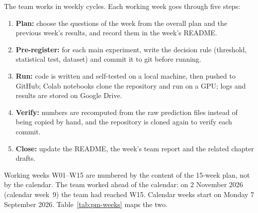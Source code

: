 The team works in weekly cycles. Each working week goes through five steps:

\begin{enumerate}
  \item \textbf{Plan:} choose the questions of the week from the overall plan and
  the previous week's results, and record them in the week's README.
  \item \textbf{Pre-register:} for each main experiment, write the decision rule
  (threshold, statistical test, dataset) and commit it to git before running.
  \item \textbf{Run:} code is written and self-tested on a local machine, then
  pushed to GitHub; Colab notebooks clone the repository and run on a GPU; logs
  and results are stored on Google Drive.
  \item \textbf{Verify:} numbers are recomputed from the raw prediction files
  instead of being copied by hand, and the repository is cloned again to verify
  each commit.
  \item \textbf{Close:} update the README, the week's team report and the
  related chapter drafts.
\end{enumerate}

Working weeks W01--W15 are numbered by the content of the 15-week plan, not by
the calendar. The team worked ahead of the calendar: on 2 November 2026
(calendar week~9) the team had reached W15. Calendar weeks start on Monday
7 September 2026. Table~\ref{tab:pm-weeks} maps the two.

